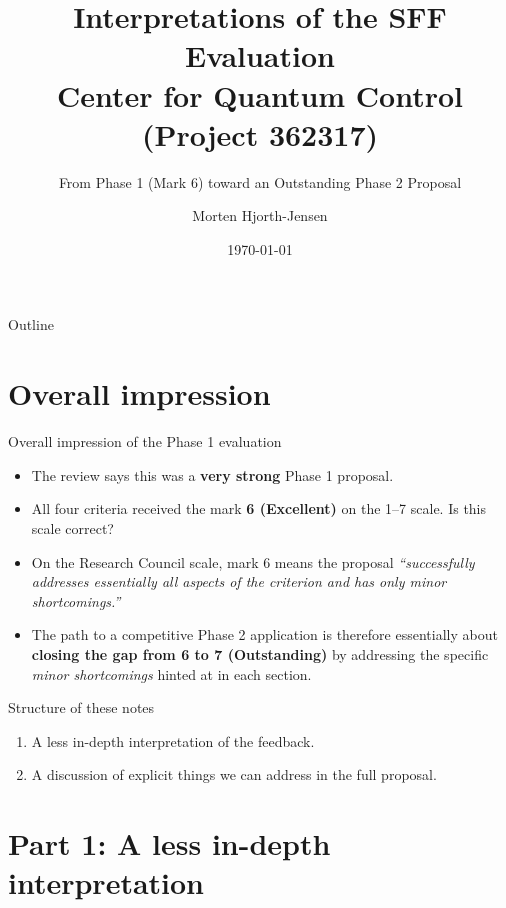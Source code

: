 \documentclass[10pt,aspectratio=169]{beamer}
\title[SFF Evaluation -- Interpretation]{Interpretations of the SFF Evaluation \\ \small Center for Quantum Control (Project 362317)}
\subtitle{From Phase 1 (Mark 6) toward an Outstanding Phase 2 Proposal}
\author{Morten Hjorth-Jensen}
\institute[UiO]{University of Oslo}
\date{\today}
\begin{document}
\begin{frame}
  \titlepage
\end{frame}

\begin{frame}{Outline}
  \tableofcontents
\end{frame}

\section{Overall impression}
\begin{frame}{Overall impression of the Phase 1 evaluation}
  \begin{itemize}
    \item The review says this  was a \textbf{very strong} Phase 1 proposal.
    \item All four criteria received the mark \textbf{6 (Excellent)} on the 1--7 scale. Is this scale correct?
    \item On the Research Council scale, mark 6 means the proposal
          \emph{``successfully addresses essentially all aspects of the criterion and has only minor shortcomings.''}
    \item The path to a competitive Phase 2 application is therefore essentially about
          \textbf{closing the gap from 6 to 7 (Outstanding)} by addressing the specific
          \emph{minor shortcomings} hinted at in each section.
  \end{itemize}
  \vfill
  \begin{block}{Structure of these notes}
    \begin{enumerate}
      \item A less in-depth interpretation of the feedback.
      \item A discussion of explicit things we can address in the full proposal.
    \end{enumerate}
  \end{block}
\end{frame}

\section{Part 1: A less in-depth interpretation}
\end{document}

